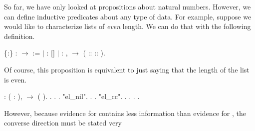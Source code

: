 \documentclass[12pt]{report}
\begin{document}
 So far, we have only looked at propositions about natural numbers. However, 
   we can define inductive predicates about any type of data. For example, 
   suppose we would like to characterize lists of \textit{even} length. We can 
   do that with the following definition.  \begin{coqdoccode}
\coqdocemptyline
\coqdocnoindent
{}  \{:\} :   \ensuremath{\rightarrow}  :=\coqdoceol
\coqdocindent{1.00em}
\ensuremath{|}  :  []\coqdoceol
\coqdocindent{1.00em}
\ensuremath{|}   : \coqdockw{\ensuremath{\forall}}   ,   \ensuremath{\rightarrow}  ( ::  :: ).\coqdoceol
\coqdocemptyline
\end{coqdoccode}
Of course, this proposition is equivalent to just saying that the
length of the list is even. \begin{coqdoccode}
\coqdocemptyline
\coqdocnoindent
{} : \coqdockw{\ensuremath{\forall}}  ( :  ),   \ensuremath{\rightarrow}  ( ).\coqdoceol
\coqdocnoindent
{}.\coqdoceol
\coqdocindent{2.00em}
   .  .\coqdoceol
\coqdocindent{2.00em}
 "el\_nil". .  .\coqdoceol
\coqdocindent{2.00em}
 "el\_cc". .  .  .\coqdoceol
\coqdocnoindent
{}.\coqdoceol
\coqdocemptyline
\end{coqdoccode}
However, because evidence for  contains less information than
evidence for , the converse direction must be stated very
\end{document}
